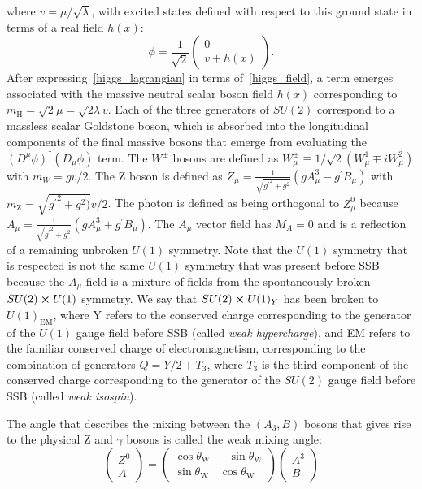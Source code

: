 where $v = \mu/\sqrt{\lambda}$, with excited states defined with respect to this
ground state in terms of a real field $h(x)$:
\begin{equation}\label{higgs_field}
  \phi = \frac{1}{\sqrt{2}} \left(
    \begin{array}{c}
      0 \\
      v + h(x)
    \end{array}
  \right).
\end{equation}
After expressing~\cref{higgs_lagrangian} in terms of~\cref{higgs_field}, a term
emerges associated with the massive neutral scalar boson field $h(x)$
corresponding to $m_\text{H}=\sqrt{2}\mu=\sqrt{2\lambda}v$. Each of the three
generators of $SU(2)$ correspond to a massless scalar Goldstone boson, which is
absorbed into the longitudinal components of the final massive bosons that
emerge from evaluating the $(D^\mu\phi)^\dagger(D_\mu\phi)$ term. The $W^\pm$
bosons are defined as $W^\pm_\mu \equiv 1/\sqrt{2}(W_\mu^1 \mp i W_\mu^2)$ with
$m_W=gv/2$. The Z boson is defined as
$Z_\mu=\frac{1}{\sqrt{{g^\prime}^2+g^2}}(gA_\mu^3-g^\prime B_\mu)$ with
$m_\text{Z}=\sqrt{{g^\prime}^2+g^2)}v/2$. The photon is defined as being
orthogonal to $Z_\mu^0$ because
$A_\mu=\frac{1}{\sqrt{{g^\prime}^2+g^2}}(gA_\mu^3+g^\prime B_\mu)$. The $A_\mu$
vector field has $M_A=0$ and is a reflection of a remaining unbroken $U(1)$
symmetry. Note that the $U(1)$ symmetry that is respected is not the same $U(1)$
symmetry that was present before SSB because the $A_\mu$ field is a mixture of
fields from the spontaneously broken $SU(2) \cross U(1)$ symmetry. We say that
$SU(2) \cross U(1)_Y$ has been broken to $U(1)_{\text{EM}}$, where Y refers to
the conserved charge corresponding to the generator of the $U(1)$ gauge field
before SSB (called \textit{weak hypercharge}), and EM refers to the familiar
conserved charge of electromagnetism, corresponding to the combination of
generators $Q = Y/2 + T_3$, where $T_3$ is the third component of the conserved
charge corresponding to the generator of the $SU(2)$ gauge field before SSB
(called \textit{weak isospin}).

The angle that describes the mixing between the $(A_3, B)$ bosons that gives
rise to the physical Z and $\gamma$ bosons is called the weak mixing angle:
\begin{equation}
  \left(\begin{array}{c}
      Z^0 \\
      A
    \end{array}
  \right) =
  \left(
    \begin{array}{cc}
      \cos \theta_\text{W} & - \sin\theta_\text{W} \\
      \sin \theta_\text{W} & \cos\theta_\text{W}
    \end{array}
  \right)
  \left(
    \begin{array}{c}
      A^3 \\
      B
    \end{array}
  \right)
\end{equation}

